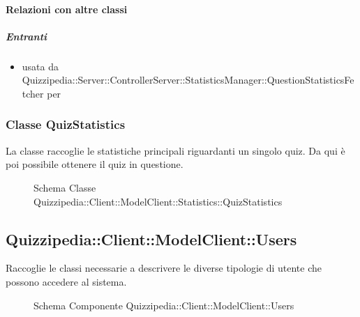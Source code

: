 \paragraph{Relazioni con altre classi}
\subparagraph{Entranti}
\begin{itemize}
\item usata da Quizzipedia::Server::ControllerServer::StatisticsManager::QuestionStatisticsFetcher per 
\end{itemize}
\subsubsection{Classe QuizStatistics}
La classe raccoglie le statistiche principali riguardanti un singolo quiz. Da qui è poi possibile ottenere il quiz in questione.
\begin{figure}[H]
\centering
\noindent{}
\caption[Schema Classe QuizStatistics]{Schema Classe Quizzipedia::Client::ModelClient::Statistics::QuizStatistics}
\end{figure}
\subsection{Quizzipedia::Client::ModelClient::Users}
Raccoglie le classi necessarie a descrivere le diverse tipologie di utente che possono accedere al sistema.
\begin{figure}[H]
\centering
\noindent{}
\caption[Schema Componente Quizzipedia::Client::ModelClient::Users]{Schema Componente Quizzipedia::Client::ModelClient::Users}
\end{figure}
